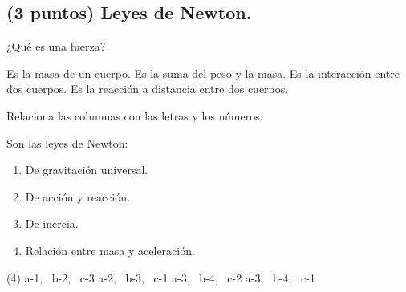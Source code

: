 \documentclass[12pt, letter]{exam}
\begin{document}
\begin{questions}
    \section{(3 puntos) Leyes de Newton.}

    \question ¿Qué es una fuerza?
    \begin{tasks}
        \task Es la masa de un cuerpo.
        \task Es la suma del peso y la masa.
        \task Es la interacción entre dos cuerpos.
        \task Es la reacción a distancia entre dos cuerpos.
    \end{tasks}
    \question Relaciona las columnas con las letras y los números.
    
    Son las leyes de Newton:
    
    \begin{minipage}[t]{0.4\linewidth}
    \end{minipage}
    \hspace{-0.5cm}
    \begin{minipage}[t]{0.5\linewidth}
        \begin{enumerate}[label=\arabic*)]
            \itemsep0em
            \item De gravitación universal.
            \item De acción y reacción.
            \item De inercia.
            \item Relación entre masa y aceleración.
        \end{enumerate}
    \end{minipage}
    \begin{tasks}(4)
        \task a-1, \, b-2, \, c-3
        \task a-2, \, b-3, \, c-1
        \task a-3, \, b-4, \, c-2
        \task a-3, \, b-4, \, c-1
    \end{tasks}
    


\end{questions}
\end{document}
